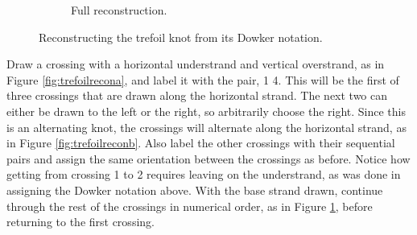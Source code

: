 \documentclass[titlepage]{article}
\begin{document}
\begin{figure}[h!]
\begin{subfigure}[b]{0.3\linewidth}
        \vspace{-0.8em}
        \caption{Full reconstruction.}
        \label{fig:trefoilreconc}
    \end{subfigure}
    \caption{Reconstructing the trefoil knot from its Dowker notation.}
    \label{fig:trefoilrecon}
\end{figure}

Draw a crossing with a horizontal understrand and vertical overstrand, as in Figure \ref{fig:trefoilrecona}, and label it with the pair, 1 4. This will be the first of three crossings that are drawn along the horizontal strand. The next two can either be drawn to the left or the right, so arbitrarily choose the right. Since this is an alternating knot, the crossings will alternate along the horizontal strand, as in Figure \ref{fig:trefoilreconb}. Also label the other crossings with their sequential pairs and assign the same orientation between the crossings as before. Notice how getting from crossing 1 to 2 requires leaving on the understrand, as was done in assigning the Dowker notation above. With the base strand drawn, continue through the rest of the crossings in numerical order, as in Figure \ref{fig:trefoilreconc}, before returning to the first crossing.\par
\end{document}
